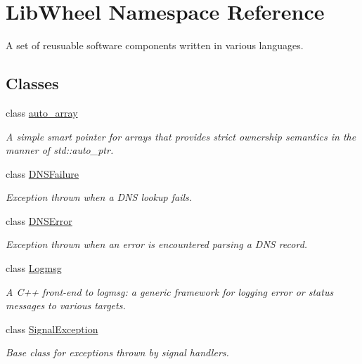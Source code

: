 \hypertarget{namespaceLibWheel}{
\section{\-Lib\-Wheel \-Namespace \-Reference}
\label{namespaceLibWheel}
}


\-A set of reusuable software components written in various languages.  


\subsection*{\-Classes}
\begin{DoxyCompactItemize}
\item 
class \hyperlink{classLibWheel_1_1auto__array}{auto\-\_\-array}
\begin{DoxyCompactList}\small\item\em \-A simple smart pointer for arrays that provides strict ownership semantics in the manner of std\-::auto\-\_\-ptr. \end{DoxyCompactList}\item 
class \hyperlink{classLibWheel_1_1DNSFailure}{\-D\-N\-S\-Failure}
\begin{DoxyCompactList}\small\item\em \-Exception thrown when a \-D\-N\-S lookup fails. \end{DoxyCompactList}\item 
class \hyperlink{classLibWheel_1_1DNSError}{\-D\-N\-S\-Error}
\begin{DoxyCompactList}\small\item\em \-Exception thrown when an error is encountered parsing a \-D\-N\-S record. \end{DoxyCompactList}\item 
class \hyperlink{classLibWheel_1_1Logmsg}{\-Logmsg}
\begin{DoxyCompactList}\small\item\em \-A \-C++ front-\/end to logmsg\-: a generic framework for logging error or status messages to various targets. \end{DoxyCompactList}\item 
class \hyperlink{classLibWheel_1_1SignalException}{\-Signal\-Exception}
\begin{DoxyCompactList}\small\item\em \-Base class for exceptions thrown by signal handlers. \end{DoxyCompactList}\item 

\end{DoxyCompactItemize}
